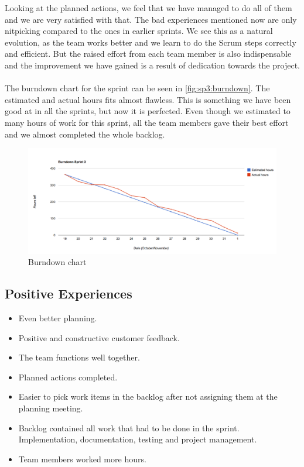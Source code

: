 Looking at the planned actions, we feel that we have managed to do all of them and we are very satisfied with that. The bad experiences mentioned now are only nitpicking compared to the ones in earlier sprints. We see this as a natural evolution, as the team works better and we learn to do the Scrum steps correctly and efficient. But the raised effort from each team member is also indispensable and the improvement we have gained is a result of dedication towards the project.
\\
\\   
The burndown chart for the sprint can be seen in \autoref{fig:sp3:burndown}. The estimated and actual hours fits almost flawless. This is something we have been good at in all the sprints, but now it is perfected. Even though we estimated to many hours of work for this sprint, all the team members gave their best effort and we almost completed the whole backlog. 
\begin{figure}[!htb]
	\includegraphics[width=\textwidth]{./sprints/img/burndown_chart_s3}
	\caption{Burndown chart\label{fig:sp3:burndown}}
\end{figure}


\subsection{Positive Experiences}
\begin{itemize}
	\item Even better planning.
	\item Positive and constructive customer feedback.
	\item The team functions well together.
	\item Planned actions completed.
	\item Easier to pick work items in the backlog after not assigning them at the planning meeting.
	\item Backlog contained all work that had to be done in the sprint. Implementation, documentation, testing and project management.
	\item Team members worked more hours. 
\end{itemize}


